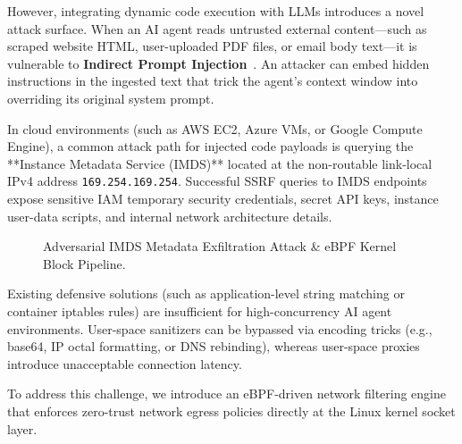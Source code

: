\documentclass[11pt,a4paper]{article}
\begin{document}
However, integrating dynamic code execution with LLMs introduces a novel attack surface. When an AI agent reads untrusted external content—such as scraped website HTML, user-uploaded PDF files, or email body text—it is vulnerable to \textbf{Indirect Prompt Injection}~\cite{prompt_injection}. An attacker can embed hidden instructions in the ingested text that trick the agent's context window into overriding its original system prompt.

In cloud environments (such as AWS EC2, Azure VMs, or Google Compute Engine), a common attack path for injected code payloads is querying the **Instance Metadata Service (IMDS)** located at the non-routable link-local IPv4 address \texttt{169.254.169.254}. Successful SSRF queries to IMDS endpoints expose sensitive IAM temporary security credentials, secret API keys, instance user-data scripts, and internal network architecture details.

\begin{figure}[h!]
\centering
{}
\caption{Adversarial IMDS Metadata Exfiltration Attack \& eBPF Kernel Block Pipeline.}
\label{fig:imds_attack}
\end{figure}

Existing defensive solutions (such as application-level string matching or container iptables rules) are insufficient for high-concurrency AI agent environments. User-space sanitizers can be bypassed via encoding tricks (e.g., base64, IP octal formatting, or DNS rebinding), whereas user-space proxies introduce unacceptable connection latency.

To address this challenge, we introduce an eBPF-driven network filtering engine that enforces zero-trust network egress policies directly at the Linux kernel socket layer.
\end{document}

